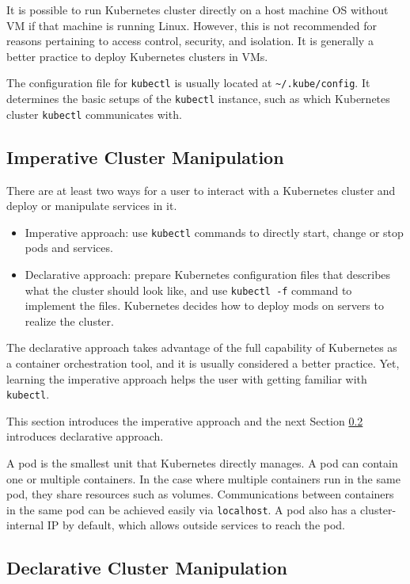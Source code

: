 It is possible to run Kubernetes cluster directly on a host machine OS without VM if that machine is running Linux. However, this is not recommended for reasons pertaining to access control, security, and isolation. It is generally a better practice to deploy Kubernetes clusters in VMs.

The configuration file for \verb|kubectl| is usually located at \verb|~/.kube/config|. It determines the basic setups of the \verb|kubectl| instance, such as which Kubernetes cluster \verb|kubectl| communicates with.

\subsection{Imperative Cluster Manipulation}

There are at least two ways for a user to interact with a Kubernetes cluster and deploy or manipulate services in it.
\begin{itemize}
  \item Imperative approach: use \verb|kubectl| commands to directly start, change or stop pods and services.
  \item Declarative approach: prepare Kubernetes configuration files that describes what the cluster should look like, and use \verb|kubectl -f| command to implement the files. Kubernetes decides how to deploy mods on servers to realize the cluster.
\end{itemize}
The declarative approach takes advantage of the full capability of Kubernetes as a container orchestration tool, and it is usually considered a better practice. Yet, learning the imperative approach helps the user with getting familiar with \verb|kubectl|.

This section introduces the imperative approach and the next Section \ref{ch:vac:subsec:k8sconfigurationfiles} introduces declarative approach.

A pod is the smallest unit that Kubernetes directly manages. A pod can contain one or multiple containers. In the case where multiple containers run in the same pod, they share resources such as volumes. Communications between containers in the same pod can be achieved easily via \verb|localhost|. A pod also has a cluster-internal IP by default, which allows outside services to reach the pod.

\subsection{Declarative Cluster Manipulation} \label{ch:vac:subsec:k8sconfigurationfiles}

